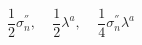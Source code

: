 \begin{equation}
\frac{1}{2} \sigma_{n}^{''} ,~~~~~\frac{1}{2} \lambda^{a} ,~~~~~
\frac{1}{4} \sigma_{n}^{''} \lambda^{a}
\end{equation}

